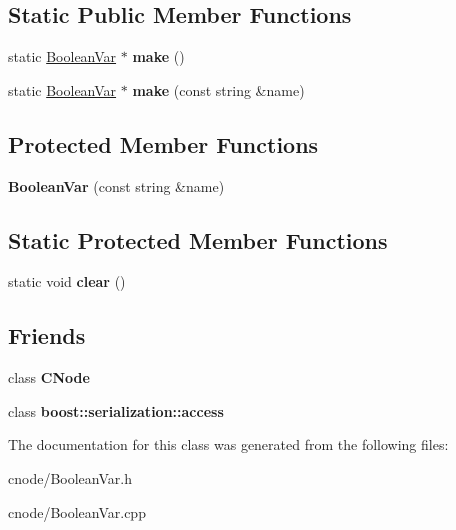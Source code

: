 \subsection*{\-Static \-Public \-Member \-Functions}
\begin{DoxyCompactItemize}
\item 
\hypertarget{classBooleanVar_a174c5223e0b0874c114f7588b3fb1dd8}{static \hyperlink{classBooleanVar}{\-Boolean\-Var} $\ast$ {\bfseries make} ()}\label{classBooleanVar_a174c5223e0b0874c114f7588b3fb1dd8}

\item 
\hypertarget{classBooleanVar_a45d68b4599d3d95beef9194747a92d2c}{static \hyperlink{classBooleanVar}{\-Boolean\-Var} $\ast$ {\bfseries make} (const string \&name)}\label{classBooleanVar_a45d68b4599d3d95beef9194747a92d2c}

\end{DoxyCompactItemize}
\subsection*{\-Protected \-Member \-Functions}
\begin{DoxyCompactItemize}
\item 
\hypertarget{classBooleanVar_a64ca91008decaf02252aa0d8732e8c20}{{\bfseries \-Boolean\-Var} (const string \&name)}\label{classBooleanVar_a64ca91008decaf02252aa0d8732e8c20}

\end{DoxyCompactItemize}
\subsection*{\-Static \-Protected \-Member \-Functions}
\begin{DoxyCompactItemize}
\item 
\hypertarget{classBooleanVar_a26c04fe2ab7dbabfe4f548fed3d7f697}{static void {\bfseries clear} ()}\label{classBooleanVar_a26c04fe2ab7dbabfe4f548fed3d7f697}

\end{DoxyCompactItemize}
\subsection*{\-Friends}
\begin{DoxyCompactItemize}
\item 
\hypertarget{classBooleanVar_a0657a422d4ddc5f4a0ff56931b7d2767}{class {\bfseries \-C\-Node}}\label{classBooleanVar_a0657a422d4ddc5f4a0ff56931b7d2767}

\item 
\hypertarget{classBooleanVar_ac98d07dd8f7b70e16ccb9a01abf56b9c}{class {\bfseries boost\-::serialization\-::access}}\label{classBooleanVar_ac98d07dd8f7b70e16ccb9a01abf56b9c}

\end{DoxyCompactItemize}


\-The documentation for this class was generated from the following files\-:\begin{DoxyCompactItemize}
\item 
cnode/\-Boolean\-Var.\-h\item 
cnode/\-Boolean\-Var.\-cpp\end{DoxyCompactItemize}
